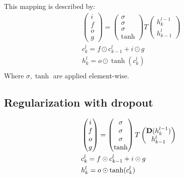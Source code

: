 \documentclass{article}
\begin{document}
This mapping is described by:
\begin{align*}
&\begin{pmatrix}i\\f\\o\\g\end{pmatrix} =
  \begin{pmatrix}\sigma\\\sigma\\\sigma\\\tanh\end{pmatrix}
  T\begin{pmatrix}h^{l - 1}_k\\h^l_{k-1}\end{pmatrix}\\
&c^l_k = f \odot c^l_{k-1} + i \odot g\\
&h^l_k = o \odot \tanh(c^l_k)\\
\end{align*}
Where $\sigma, \tanh$ are applied element-wise.



\subsection{Regularization with dropout} 
\label{sec:reg}



\begin{align*}
&\begin{pmatrix}i\\f\\o\\g\end{pmatrix} =
  \begin{pmatrix}\sigma\\\sigma\\\sigma\\\tanh\end{pmatrix}
  T\begin{pmatrix}{\bf D}(h^{l - 1}_k)\\h^l_{k-1}\end{pmatrix}\\
&c^l_k = f \odot c^l_{k-1} + i \odot g\\
&h^l_k = o \odot \tanh(c^l_k)\\
\end{align*}
\end{document}
